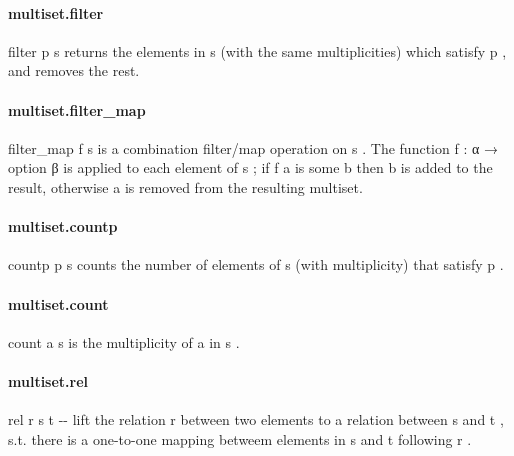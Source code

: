 \documentclass{article}
\begin{document}
\paragraph{multiset.filter}
\par
\colorbox[RGB]{253,246,227}{{{{\color[RGB]{101, 123, 131} filter p s }}}} returns the elements in 
\colorbox[RGB]{253,246,227}{{{{\color[RGB]{101, 123, 131} s }}}} (with the same multiplicities)
which satisfy 
\colorbox[RGB]{253,246,227}{{{{\color[RGB]{101, 123, 131} p }}}}, and removes the rest.
\paragraph{multiset.filter\_map}
\par
\colorbox[RGB]{253,246,227}{{{{\color[RGB]{101, 123, 131} filter\_map f s }}}} is a combination filter/map operation on 
\colorbox[RGB]{253,246,227}{{{{\color[RGB]{101, 123, 131} s }}}}.
The function 
\colorbox[RGB]{253,246,227}{{{{\color[RGB]{101, 123, 131} f : α  }}}{{{\color[RGB]{133, 153, 0} → }}}{{{\color[RGB]{101, 123, 131}  option β }}}} is applied to each element of 
\colorbox[RGB]{253,246,227}{{{{\color[RGB]{101, 123, 131} s }}}};
if 
\colorbox[RGB]{253,246,227}{{{{\color[RGB]{101, 123, 131} f a }}}} is 
\colorbox[RGB]{253,246,227}{{{{\color[RGB]{101, 123, 131} some b }}}} then 
\colorbox[RGB]{253,246,227}{{{{\color[RGB]{101, 123, 131} b }}}} is added to the result, otherwise
\colorbox[RGB]{253,246,227}{{{{\color[RGB]{101, 123, 131} a }}}} is removed from the resulting multiset.
\paragraph{multiset.countp}
\par
\colorbox[RGB]{253,246,227}{{{{\color[RGB]{101, 123, 131} countp p s }}}} counts the number of elements of 
\colorbox[RGB]{253,246,227}{{{{\color[RGB]{101, 123, 131} s }}}} (with multiplicity) that
satisfy 
\colorbox[RGB]{253,246,227}{{{{\color[RGB]{101, 123, 131} p }}}}.
\paragraph{multiset.count}
\par
\colorbox[RGB]{253,246,227}{{{{\color[RGB]{101, 123, 131} count a s }}}} is the multiplicity of 
\colorbox[RGB]{253,246,227}{{{{\color[RGB]{101, 123, 131} a }}}} in 
\colorbox[RGB]{253,246,227}{{{{\color[RGB]{101, 123, 131} s }}}}.
\paragraph{multiset.rel}
\par
\colorbox[RGB]{253,246,227}{{{{\color[RGB]{101, 123, 131} rel r s t }}}} -{}- lift the relation 
\colorbox[RGB]{253,246,227}{{{{\color[RGB]{101, 123, 131} r }}}} between two elements to a relation between 
\colorbox[RGB]{253,246,227}{{{{\color[RGB]{101, 123, 131} s }}}} and 
\colorbox[RGB]{253,246,227}{{{{\color[RGB]{101, 123, 131} t }}}},
s.t. there is a one-to-one mapping betweem elements in 
\colorbox[RGB]{253,246,227}{{{{\color[RGB]{101, 123, 131} s }}}} and 
\colorbox[RGB]{253,246,227}{{{{\color[RGB]{101, 123, 131} t }}}} following 
\colorbox[RGB]{253,246,227}{{{{\color[RGB]{101, 123, 131} r }}}}.
\end{document}
